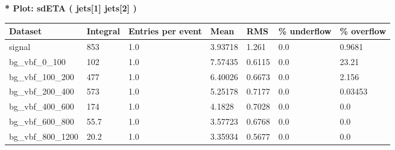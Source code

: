 \documentclass[a4paper, 10pt]{article}
\begin{document}
\textbf{* Plot: sdETA ( jets[1] jets[2] ) }\\
   \begin{table}[H]
  \begin{center}
    \begin{tabular}{|m{23.0mm}|m{23.0mm}|m{18.0mm}|m{19.0mm}|m{19.0mm}|m{19.0mm}|m{19.0mm}|}
      \hline
      {\cellcolor{yellow}         Dataset}& {\cellcolor{yellow}         Integral}& {\cellcolor{yellow}         Entries per event}& {\cellcolor{yellow}         Mean}& {\cellcolor{yellow}         RMS}& {\cellcolor{yellow}         \% underflow}& {\cellcolor{yellow}         \% overflow}\\
      \hline
      {\cellcolor{white}         signal}& {\cellcolor{white}         853}& {\cellcolor{white}         1.0}& {\cellcolor{white}         3.93718}& {\cellcolor{white}         1.261}& {\cellcolor{green}         0.0}& {\cellcolor{green}         0.9681}\\
      \hline
      {\cellcolor{white}         bg\_vbf\_0\_100}& {\cellcolor{white}         102}& {\cellcolor{white}         1.0}& {\cellcolor{white}         7.57435}& {\cellcolor{white}         0.6115}& {\cellcolor{red}         0.0}& {\cellcolor{red}         23.21}\\
      \hline
      {\cellcolor{white}         bg\_vbf\_100\_200}& {\cellcolor{white}         477}& {\cellcolor{white}         1.0}& {\cellcolor{white}         6.40026}& {\cellcolor{white}         0.6673}& {\cellcolor{green}         0.0}& {\cellcolor{green}         2.156}\\
      \hline
      {\cellcolor{white}         bg\_vbf\_200\_400}& {\cellcolor{white}         573}& {\cellcolor{white}         1.0}& {\cellcolor{white}         5.25178}& {\cellcolor{white}         0.7177}& {\cellcolor{green}         0.0}& {\cellcolor{green}         0.03453}\\
      \hline
      {\cellcolor{white}         bg\_vbf\_400\_600}& {\cellcolor{white}         174}& {\cellcolor{white}         1.0}& {\cellcolor{white}         4.1828}& {\cellcolor{white}         0.7028}& {\cellcolor{green}         0.0}& {\cellcolor{green}         0.0}\\
      \hline
      {\cellcolor{white}         bg\_vbf\_600\_800}& {\cellcolor{white}         55.7}& {\cellcolor{white}         1.0}& {\cellcolor{white}         3.57723}& {\cellcolor{white}         0.6768}& {\cellcolor{green}         0.0}& {\cellcolor{green}         0.0}\\
      \hline
      {\cellcolor{white}         bg\_vbf\_800\_1200}& {\cellcolor{white}         20.2}& {\cellcolor{white}         1.0}& {\cellcolor{white}         3.35934}& {\cellcolor{white}         0.5677}& {\cellcolor{green}         0.0}& {\cellcolor{green}         0.0}\\

\end{tabular}
\end{center}
\end{table}
\end{document}
